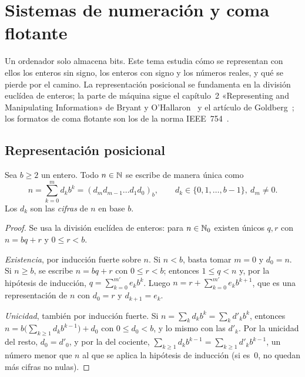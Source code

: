 \chapter{Sistemas de numeración y coma flotante}
\label{tema:6}

Un ordenador solo almacena bits. Este tema estudia cómo se representan con ellos los enteros sin signo, los enteros con signo y los números reales, y qué se pierde por el camino. La representación posicional se fundamenta en la división euclídea de enteros; la parte de máquina sigue el capítulo~2 «Representing and Manipulating Information» de Bryant y O'Hallaron~\cite{csapp} y el artículo de Goldberg~\cite{goldberg}; los formatos de coma flotante son los de la norma IEEE~754~\cite{ieee754}.

\section{Representación posicional}

\begin{teorema}\label{teo:base}
Sea $b\ge2$ un entero. Todo $n\in\mathbb{N}$ se escribe de manera única como
\[
n=\sum_{k=0}^{m}d_kb^k=(d_md_{m-1}\dots d_1d_0)_b,\qquad d_k\in\{0,1,\dots,b-1\},\ d_m\neq0.
\]
Los $d_k$ son las \emph{cifras} de $n$ en base $b$.
\end{teorema}

\begin{proof}
Se usa la división euclídea de enteros: para $n\in\mathbb{N}_0$ existen únicos $q,r$ con $n=bq+r$ y $0\le r<b$.

\emph{Existencia}, por inducción fuerte sobre $n$. Si $n<b$, basta tomar $m=0$ y $d_0=n$. Si $n\ge b$, se escribe $n=bq+r$ con $0\le r<b$; entonces $1\le q<n$ y, por la hipótesis de inducción, $q=\sum_{k=0}^{m'}e_kb^k$. Luego $n=r+\sum_{k=0}^{m'}e_kb^{k+1}$, que es una representación de $n$ con $d_0=r$ y $d_{k+1}=e_k$.

\emph{Unicidad}, también por inducción fuerte. Si $n=\sum_kd_kb^k=\sum_kd'_kb^k$, entonces $n=b\bigl(\sum_{k\ge1}d_kb^{k-1}\bigr)+d_0$ con $0\le d_0<b$, y lo mismo con las $d'_k$. Por la unicidad del resto, $d_0=d'_0$, y por la del cociente, $\sum_{k\ge1}d_kb^{k-1}=\sum_{k\ge1}d'_kb^{k-1}$, un número menor que $n$ al que se aplica la hipótesis de inducción (si es~0, no quedan más cifras no nulas).
\end{proof}

